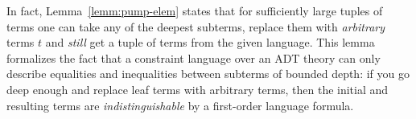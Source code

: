 In fact, Lemma~\ref{lemm:pump-elem} states that for sufficiently large tuples of terms one can take any of the deepest subterms, replace them with \emph{arbitrary} terms $ t $ and \emph{still} get a tuple of terms from the given language.
This lemma formalizes the fact that a constraint language over an ADT theory can only describe equalities and inequalities between subterms of bounded depth: if you go deep enough and replace leaf terms with arbitrary terms, then the initial and resulting terms are \emph{indistinguishable} by a first-order language formula.

